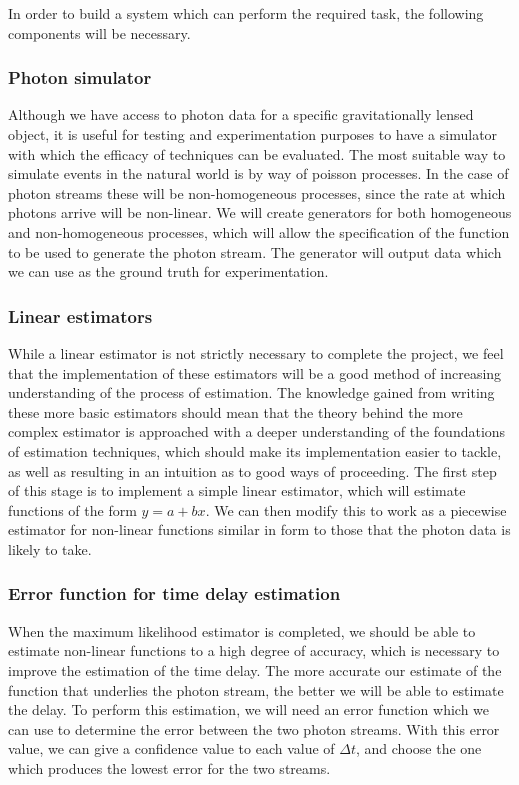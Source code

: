\documentclass[a4paper,12pt]{article}
\begin{document}
   In order to build a system which can perform the required task, the
   following components will be necessary.
   
\subsubsection{Photon simulator}
\label{sec-1-4-1}

    Although we have access to photon data for a specific
    gravitationally lensed object, it is useful for testing and
    experimentation purposes to have a simulator with which the
    efficacy of techniques can be evaluated. The most suitable way to
    simulate events in the natural world is by way of poisson
    processes. In the case of photon streams these will be
    non-homogeneous processes, since the rate at which photons arrive
    will be non-linear. We will create generators for both homogeneous
    and non-homogeneous processes, which will allow the specification
    of the function to be used to generate the photon stream. The
    generator will output data which we can use as the ground truth
    for experimentation.
\subsubsection{Linear estimators}
\label{sec-1-4-2}

    While a linear estimator is not strictly necessary to complete the
    project, we feel that the implementation of these estimators will
    be a good method of increasing understanding of the process of
    estimation. The knowledge gained from writing these more basic
    estimators should mean that the theory behind the more complex
    estimator is approached with a deeper understanding of the
    foundations of estimation techniques, which should make its
    implementation easier to tackle, as well as resulting in an
    intuition as to good ways of proceeding. The first step of this
    stage is to implement a simple linear estimator, which will
    estimate functions of the form $y=a+bx$. We can then modify this
    to work as a piecewise estimator for non-linear functions similar
    in form to those that the photon data is likely to take.
\subsubsection{Error function for time delay estimation}
\label{sec-1-4-3}

    When the maximum likelihood estimator is completed, we should be
    able to estimate non-linear functions to a high degree of
    accuracy, which is necessary to improve the estimation of the time
    delay. The more accurate our estimate of the function that
    underlies the photon stream, the better we will be able to
    estimate the delay. To perform this estimation, we will need an
    error function which we can use to determine the error between the
    two photon streams. With this error value, we can give a
    confidence value to each value of $\Delta t$, and choose the one
    which produces the lowest error for the two streams.
\end{document}
